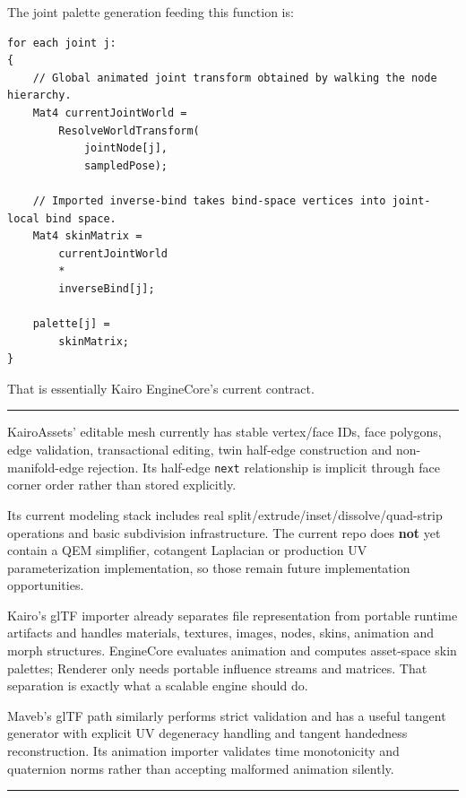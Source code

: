 The joint palette generation feeding this function is:

\begin{verbatim}
for each joint j:
{
    // Global animated joint transform obtained by walking the node hierarchy.
    Mat4 currentJointWorld =
        ResolveWorldTransform(
            jointNode[j],
            sampledPose);

    // Imported inverse-bind takes bind-space vertices into joint-local bind space.
    Mat4 skinMatrix =
        currentJointWorld
        *
        inverseBind[j];

    palette[j] =
        skinMatrix;
}
\end{verbatim}

That is essentially Kairo EngineCore's current contract.

\begin{center}\rule{0.5\linewidth}{0.5pt}\end{center}

KairoAssets' editable mesh currently has stable vertex/face IDs, face polygons, edge validation, transactional editing, twin half-edge construction and non-manifold-edge rejection. Its half-edge \texttt{next} relationship is implicit through face corner order rather than stored explicitly.

Its current modeling stack includes real split/extrude/inset/dissolve/quad-strip operations and basic subdivision infrastructure. The current repo does \textbf{not} yet contain a QEM simplifier, cotangent Laplacian or production UV parameterization implementation, so those remain future implementation opportunities.

Kairo's glTF importer already separates file representation from portable runtime artifacts and handles materials, textures, images, nodes, skins, animation and morph structures. EngineCore evaluates animation and computes asset-space skin palettes; Renderer only needs portable influence streams and matrices. That separation is exactly what a scalable engine should do.

Maveb's glTF path similarly performs strict validation and has a useful tangent generator with explicit UV degeneracy handling and tangent handedness reconstruction. Its animation importer validates time monotonicity and quaternion norms rather than accepting malformed animation silently.

\begin{center}\rule{0.5\linewidth}{0.5pt}\end{center}

